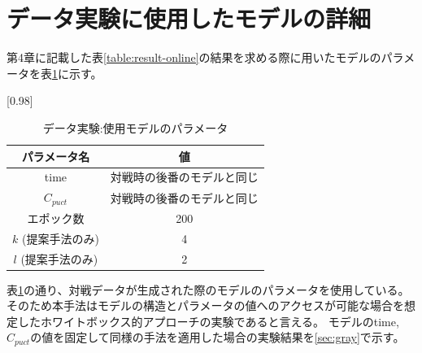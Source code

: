 \section{データ実験に使用したモデルの詳細}
第4章に記載した表\ref{table:result-online}の結果を求める際に用いたモデルのパラメータを表\ref{table:param-data}に示す。
\begin{table}[H]
	\caption{データ実験:使用モデルのパラメータ}
	\centering
	\scalebox{0.98}[0.98]{
		\begin{tabular}{c|c}
			パラメータ名 & 値 \\ \hline
			time    & 対戦時の後番のモデルと同じ \\ 
			$C_{puct}$    & 対戦時の後番のモデルと同じ \\
			エポック数 & 200 \\
			$k$ (提案手法のみ)     & 4 \\
			$l$ (提案手法のみ)     & 2 \\
		\end{tabular}
	}
	\label{table:param-data}
\end{table}

表\ref{table:param-data}の通り、対戦データが生成された際のモデルのパラメータを使用している。
そのため本手法はモデルの構造とパラメータの値へのアクセスが可能な場合を想定したホワイトボックス的アプローチの実験であると言える。
モデルのtime, $C_{puct}$の値を固定して同様の手法を適用した場合の実験結果を\ref{sec:gray}で示す。
